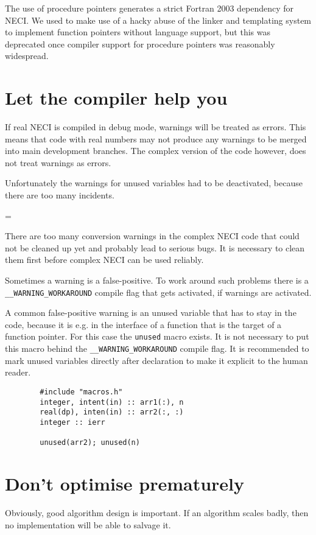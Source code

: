 \documentclass[a4paper,notitlepage,dvipsnames]{scrreprt}
\let\code\lstinline
\newenvironment{warningbox}
	{\par\begin{mdframed}[%
		linewidth = 2pt, %
	    linecolor = red, %
	    roundcorner = 6pt, %
		backgroundcolor = gray!20
	]\begin{list}{}{\leftmargin=1cm
			           \labelwidth=\leftmargin}\item[\Large\ding{43}]}
	{\end{list}\end{mdframed}\par}
\begin{document}
		The use of procedure pointers generates a strict Fortran 2003
		dependency for NECI. We used to make use of a hacky abuse of the
		linker and templating system to implement function pointers without
		language support, but this was deprecated once compiler support
		for procedure pointers was reasonably widespread.


\section{Let the compiler help you}
    If real NECI is compiled in debug mode,
    warnings will be treated as errors.
    This means that code with real numbers may not produce any warnings
    to be merged into main development branches. The complex version of the
    code however, does not treat warnings as errors.

    Unfortunately the warnings for unused variables had to be deactivated,
    because there are too many incidents.

\begin{warningbox}
    There are too many conversion warnings in the complex NECI code
    that could not be cleaned up yet and probably lead to serious bugs.
    It is necessary to clean them first before complex NECI can be used
    reliably.
\end{warningbox}

    Sometimes a warning is a false-positive.
    To work around such problems there is a \code{__WARNING_WORKAROUND}
    compile flag that gets activated, if warnings are activated.

    A common false-positive warning is an unused variable
    that has to stay in the code, because it is e.g.
    in the interface of a function that is the target of a function pointer.
    For this case the \code{unused} macro exists.
    It is not necessary to put this macro behind the \code{__WARNING_WORKAROUND}
    compile flag.
    It is recommended to mark unused variables directly after
    declaration to make it explicit to the human reader.

	\begin{lstlisting}
        #include "macros.h"
		integer, intent(in) :: arr1(:), n
		real(dp), inten(in) :: arr2(:, :)
		integer :: ierr

        unused(arr2); unused(n)
	\end{lstlisting}


\section{Don't optimise prematurely}
	Obviously, good algorithm design is important. If an algorithm scales
	badly, then no implementation will be able to salvage it.
\end{document}
